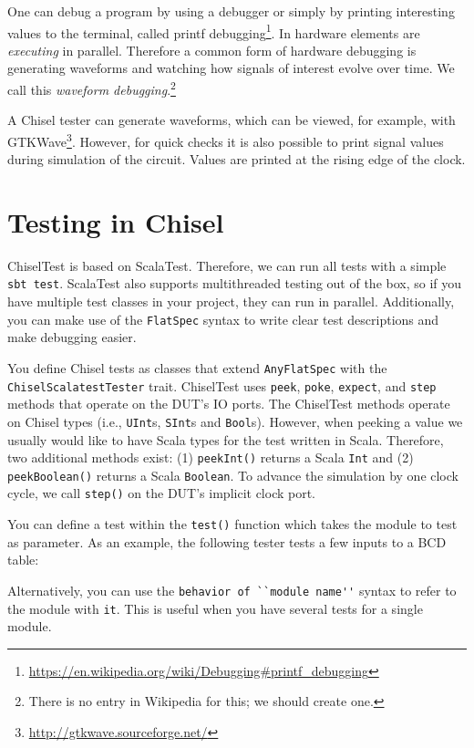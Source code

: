 \documentclass[%
    10pt,
    headinclude, footexclude,
    openright, %
    notitlepage,
    cleardoubleempty,
    headsepline,
    pointlessnumbers,
    bibtotoc, idxtotoc,
    ]{scrbook}
\newcommand{\code}[1]{{\lstinline[basicstyle=\small\ttfamily]{#1}}}
\newcommand{\myref}[2]{\href{#1}{#2}}
\renewcommand{\myref}[2]{{#2}{\footnote{\url{#1}}}}
\begin{document}
One can debug a program by using a debugger or simply by printing interesting
values to the terminal, called \myref{https://en.wikipedia.org/wiki/Debugging\#printf\_debugging}{printf debugging}.
In hardware elements are \emph{executing} in parallel. Therefore a common form of hardware
debugging is generating waveforms and watching how signals of interest evolve over time.
We call this \emph{waveform debugging}.\footnote{There is no entry in Wikipedia for this;
we should create one.}

A Chisel tester can generate waveforms, which can be viewed, for example, with \myref{http://gtkwave.sourceforge.net/}{GTKWave}.
However, for quick checks it is also possible to print signal values during simulation of the circuit.
Values are printed at the rising edge of the clock.


\section{Testing in Chisel}

ChiselTest is based on ScalaTest. Therefore, we can run all tests with a simple \code{sbt test}.
ScalaTest also supports multithreaded testing out of the box, so if you have multiple
test classes in your project, they can run in parallel. Additionally, you can make use of
the \code{FlatSpec} syntax to write clear test descriptions and make debugging easier.

You define Chisel tests as classes that extend \code{AnyFlatSpec} with
the\\ \code{ChiselScalatestTester} trait. ChiselTest uses \code{peek},
\code{poke}, \code{expect}, and \code{step} methods that operate on the DUT's IO ports.
The ChiselTest methods operate on Chisel types (i.e., \code{UInt}s,
\code{SInt}s and \code{Bool}s). However, when peeking a value we
usually would like to have Scala types for the test written in Scala.
Therefore, two additional methods exist: (1) \code{peekInt()} returns a
Scala \code{Int} and (2) \code{peekBoolean()} returns a Scala \code{Boolean}.
To advance the simulation by one clock cycle,
we call \code{step()} on the DUT's implicit clock port.

You can define a test within the \code{test()} function which takes the module to test as
parameter. As an example, the following tester tests a few inputs to  a BCD table:


Alternatively, you can use the \code{behavior of ``module name''} syntax to
refer to the module with \code{it}. This is useful when you have several tests for a
single module.
\end{document}
